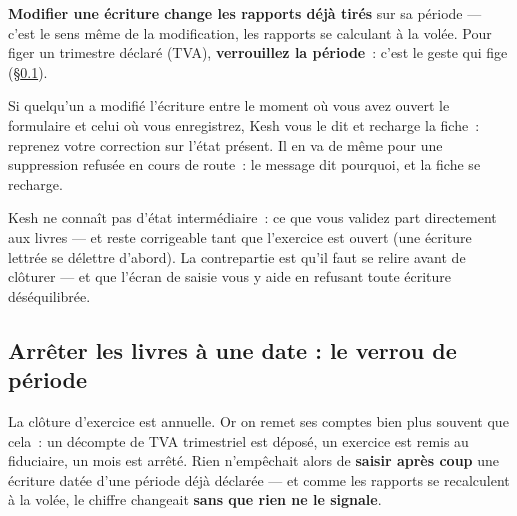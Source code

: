 \documentclass[a4paper,11pt,oneside]{article}
\begin{document}
\begin{keshwarning}
\textbf{Modifier une écriture change les rapports déjà tirés} sur sa période --- c'est le
sens même de la modification, les rapports se calculant à la volée. Pour figer un trimestre
déclaré (TVA), \textbf{verrouillez la période}~: c'est le geste qui fige
(\S\ref{sec:verrou-periode}).
\end{keshwarning}

\begin{keshnote}
Si quelqu'un a modifié l'écriture entre le moment où vous avez ouvert le formulaire et
celui où vous enregistrez, Kesh vous le dit et recharge la fiche~: reprenez votre
correction sur l'état présent. Il en va de même pour une suppression refusée en cours de
route~: le message dit pourquoi, et la fiche se recharge.
\end{keshnote}

\begin{keshtip}[title=\faLightbulb\ Pourquoi il n'y a pas de «~brouillon~»]
Kesh ne connaît pas d'état intermédiaire~: ce que vous validez part directement aux livres
--- et reste corrigeable tant que l'exercice est ouvert (une écriture lettrée se délettre
d'abord). La contrepartie est qu'il faut se
relire avant de clôturer --- et que l'écran de saisie vous y aide en refusant toute
écriture déséquilibrée.
\end{keshtip}

\subsection{Arrêter les livres à une date : le verrou de période}
\label{sec:verrou-periode}

La clôture d'exercice est annuelle. Or on remet ses comptes bien plus souvent que cela~: un
décompte de TVA trimestriel est déposé, un exercice est remis au fiduciaire, un mois est arrêté.
Rien n'empêchait alors de \textbf{saisir après coup} une écriture datée d'une période déjà
déclarée --- et comme les rapports se recalculent à la volée, le chiffre changeait \textbf{sans
que rien ne le signale}.
\end{document}

